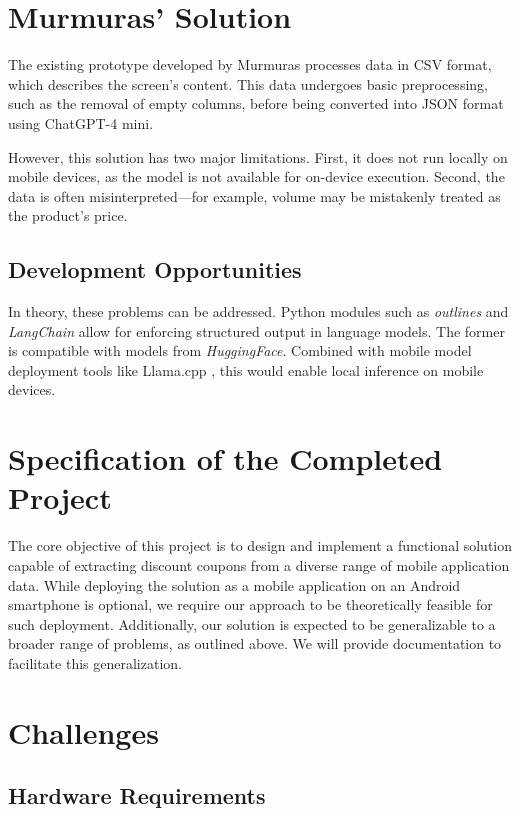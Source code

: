 \documentclass[12pt]{article}
\begin{document}
\section*{Murmuras' Solution}
The existing prototype developed by Murmuras processes data in CSV format, which describes the screen's content. This data undergoes basic preprocessing, such as the removal of empty columns, before being converted into JSON format using ChatGPT-4 mini.

However, this solution has two major limitations. First, it does not run locally on mobile devices, as the model is not available for on-device execution. Second, the data is often misinterpreted—for example, volume may be mistakenly treated as the product's price.


\subsection*{Development Opportunities}
In theory, these problems can be addressed. Python modules such as \textit{outlines} \cite{willard2023efficient} and \textit{LangChain} \cite{Chase_LangChain_2022} allow for enforcing structured output in language models. The former is compatible with models from \textit{HuggingFace}. Combined with mobile model deployment tools like Llama.cpp \cite{llamacpp}, this would enable local inference on mobile devices.

\section*{Specification of the Completed Project}
The core objective of this project is to design and implement a functional solution capable of extracting discount coupons from a diverse range of mobile application data. While deploying the solution as a mobile application on an Android smartphone is optional, we require our approach to be theoretically feasible for such deployment. Additionally, our solution is expected to be generalizable to a broader range of problems, as outlined above. We will provide documentation to facilitate this generalization.

\section*{Challenges}

\subsection*{Hardware Requirements}
\end{document}

